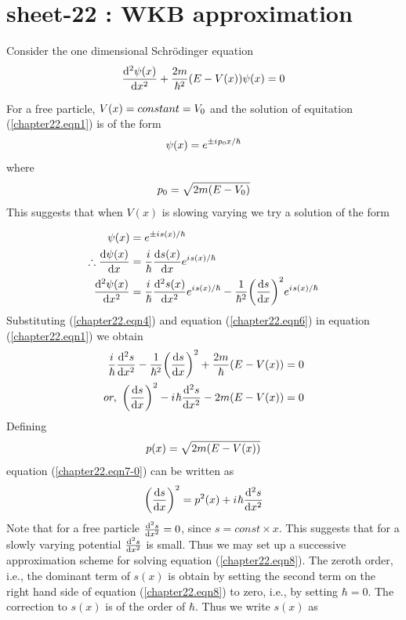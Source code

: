 
\chapter{sheet-22 : WKB approximation}
\ifpdf
\graphicspath{{Chapter22/figs/}}
\else
\graphicspath{{Chapter22/figs/}}
\fi



Consider the one dimensional Schr\"{o}dinger equation
\begin{align}
	\dv[2]{\psi\qty(x)}{x} + \frac{2 m}{\hbar^2} \qty(E - V(x)) \psi\qty(x) = 0
	\label{chapter22.eqn1}
\end{align}

For a free particle, $V\qty(x) = constant = V_0$ and the solution of equitation (\ref{chapter22.eqn1}) is of the form
\begin{equation}
	\psi\qty(x) = e^{\pm {i\mkern1mu} p_0 x / \hbar}
	\label{chapter22.eqn2}
\end{equation}
where
\begin{equation}
	p_0 = \sqrt{2 m \qty(E - V_0)}
	\label{chapter22.eqn3}
\end{equation}
This suggests that when $V(x)$ is  slowing varying we try a solution of the form

\begin{align}
\label{chapter22.eqn4}
\psi\qty(x) &= e^{\pm {i\mkern1mu} s(x) / \hbar}
\\
\label{chapter22.eqn5}
\therefore \dv{\psi(x)}{x} &= \frac{{i\mkern1mu}}{\hbar} \dv{s(x)}{x} e^{{i\mkern1mu} s(x)/\hbar}\\
\label{chapter22.eqn6}
\dv[2]{\psi(x)}{x} &= \frac{{i\mkern1mu}}{\hbar} \dv[2]{s(x)}{x} e^{{i\mkern1mu} s(x)/\hbar} - \frac{1}{\hbar^2} \qty(\dv{s}{x})^2 e^{{i\mkern1mu} s(x)/\hbar}
\end{align}
Substituting (\ref{chapter22.eqn4}) and equation (\ref{chapter22.eqn6}) in equation (\ref{chapter22.eqn1}) we obtain
\begin{align}
	\frac{{i\mkern1mu}}{\hbar} \dv[2]{s}{x} - \frac{1}{\hbar^2} \qty(\dv{s}{x})^2 + \frac{2 m}{\hbar} \qty(E - V(x)) &= 0  \nonumber\\
	\label{chapter22.eqn7-0}
	or, \ \qty(\dv{s}{x})^2 - {i\mkern1mu} \hbar \dv[2]{s}{x} - 2 m \qty(E - V(x)) &= 0
\end{align}
Defining
\begin{equation}
\label{chapter22.eqn7}
p(x) = \sqrt{2 m \qty(E - V(x))}
\end{equation}
equation (\ref{chapter22.eqn7-0}) can be written as
\begin{equation}
\qty(\dv{s}{x})^2 = p^2\qty(x) + {i\mkern1mu} \hbar \dv[2]{s}{x}
\label{chapter22.eqn8}
\end{equation}
Note that for a free particle $\dv[2]{s}{x} = 0$, since $s=const \times x$. This suggests that for a slowly varying potential $\dv[2]{s}{x}$ is small. Thus we may set up a successive approximation scheme for solving equation (\ref{chapter22.eqn8}). The zeroth order, i.e., the dominant term of $s(x)$ is obtain by setting the second term on the right hand side of equation (\ref{chapter22.eqn8}) to zero, i.e., by setting $\hbar=0$. The correction to $s(x)$ is of the order of $\hbar$. Thus we write $s(x)$ as

